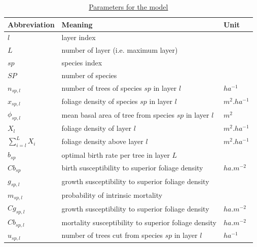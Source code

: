 \documentclass{article}
\begin{document}
\begin{table}[t]
    \centering
    \begin{tabular}{l l l}
    \hline
    \hline
    \textbf{Abbreviation} & \textbf{Meaning} & \textbf{Unit} \\
    \hline
    \hline
    $l$            & layer index                                                 &          \\
    $L$            & number of layer (i.e. maximum layer)                        &          \\
    $sp$           & species index                                               &          \\
    $SP$           & number of species                                           &            \\
    $n_{sp,l}$     & number of trees of species $sp$ in layer $l$                & $ha^{-1}$  \\    
    $x_{sp,l}$     & foliage density of species $sp$ in layer $l$                & $m^2.ha^{-1}$  \\
    $\phi_{sp,l}$     & mean basal area of tree from species $sp$ in layer $l$    & $m^2$  \\
    $X_{l}$        & foliage density of layer $l$                                & $m^2.ha^{-1}$  \\ 
    $\sum_{i = l}^{L} X_{i}$     & foliage density above layer $l$      & $m^2.ha^{-1}$  \\ 
    $b_{sp}$       & optimal birth rate per tree in layer $L$    &  \\
    $Cb_{sp}$      & birth susceptibility to superior foliage density    & $ha.m^{-2}$           \\
    $g_{sp,l}$     & growth susceptibility to superior foliage density           &  \\
    $m_{sp,l}$     & probability of intrinsic mortality           & \\
    $Cg_{sp,l}$    & growth susceptibility to superior foliage density            &   $ha.m^{-2}$  \\
    $Cb_{sp,l}$    & mortality susceptibility to superior foliage density            & $ha.m^{-2}$    \\
    $u_{sp,l}$     & number of trees cut from species $sp$ in layer $l$           & $ha^{-1}$ \\
    \hline
    \hline
    \end{tabular}
    \caption{\underline{Parameters for the model}}
\label{tab:coef}
\end{table}
\end{document}
